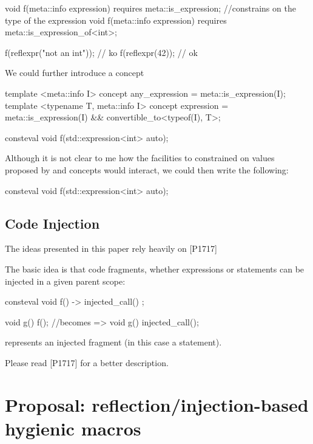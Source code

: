 \documentclass{wg21}
\begin{document}
\begin{colorblock}
void f(meta::info expression) requires meta::is_expression;
//constrains on the type of the expression
void f(meta::info expression) requires meta::is_expression_of<int>;

f(reflexpr("not an int")); // ko
f(reflexpr(42)); // ok
\end{colorblock}

We could further introduce a  concept

\begin{colorblock}
template <meta::info I>
concept any_expression = meta::is_expression(I);
template <typename T, meta::info I>
concept expression = meta::is_expression(I) && convertible_to<typeof(I), T>;
\end{colorblock}


\begin{colorblock}
consteval void f(std::expression<int> auto);
\end{colorblock}

Although it is not clear to me how the facilities to constrained on values proposed by \cite{P1240R1} and concepts
would interact, we could then write the following:

\begin{colorblock}
consteval void f(std::expression<int> auto);
\end{colorblock}

\subsection{Code Injection}

The ideas presented in this paper rely heavily on [P1717] \cite{P1717R0}

The basic idea is that code fragments, whether expressions or statements can be injected in a given parent scope:

\begin{colorblock}
consteval void f() {
    -> { injected_call() };
}

void g() {
    f();
}
//becomes =>
void g() {
    injected_call();
}

\end{colorblock}

 represents an injected fragment (in this case a statement).

Please read [P1717] \cite{P1717R0} for a better description.

\section{Proposal: reflection/injection-based hygienic macros}
\end{document}
